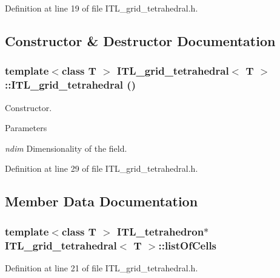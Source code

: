 Definition at line 19 of file ITL\_\-grid\_\-tetrahedral.h.



\subsection{Constructor \& Destructor Documentation}
\hypertarget{classITL__grid__tetrahedral_a1687d1ed412ceb76d008a871eb038936}{
\subsubsection[{ITL\_\-grid\_\-tetrahedral}]{\setlength{\rightskip}{0pt plus 5cm}template$<$class T $>$ {\bf ITL\_\-grid\_\-tetrahedral}$<$ T $>$::{\bf ITL\_\-grid\_\-tetrahedral} ()}}
\label{classITL__grid__tetrahedral_a1687d1ed412ceb76d008a871eb038936}


Constructor. 


\begin{DoxyParams}{Parameters}
\item[{\em ndim}]Dimensionality of the field. \end{DoxyParams}


Definition at line 29 of file ITL\_\-grid\_\-tetrahedral.h.



\subsection{Member Data Documentation}
\hypertarget{classITL__grid__tetrahedral_a4ce6a6ca28a0f7ba4c62e2a92eb6076e}{
\subsubsection[{listOfCells}]{\setlength{\rightskip}{0pt plus 5cm}template$<$class T $>$ {\bf ITL\_\-tetrahedron}$\ast$ {\bf ITL\_\-grid\_\-tetrahedral}$<$ T $>$::{\bf listOfCells}}}
\label{classITL__grid__tetrahedral_a4ce6a6ca28a0f7ba4c62e2a92eb6076e}


Definition at line 21 of file ITL\_\-grid\_\-tetrahedral.h.

